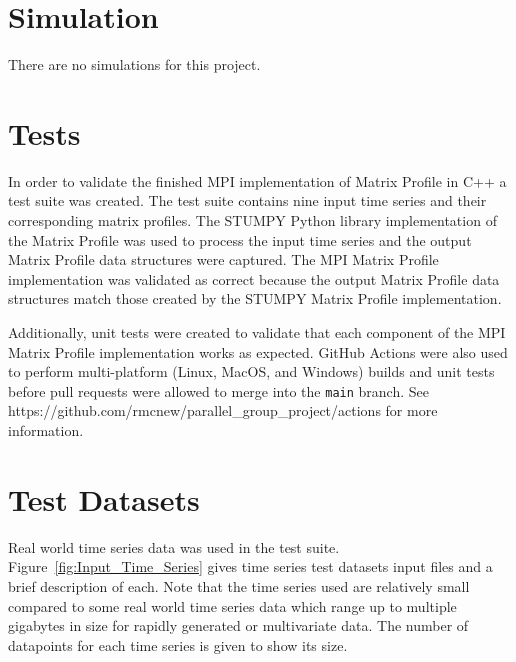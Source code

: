 \documentclass[conference]{IEEEtran}
\begin{document}
\section{Simulation}
There are no simulations for this project.

\section{Tests}
In order to validate the finished MPI implementation of Matrix Profile in C++ a test suite was created.  The test suite contains nine input time series and their corresponding matrix profiles.  The STUMPY\cite{Stumpy} Python library implementation of the Matrix Profile was used to process the input time series and the output Matrix Profile data structures were captured.  The MPI Matrix Profile implementation was validated as correct because the output Matrix Profile data structures match those created by the STUMPY Matrix Profile implementation. 

Additionally, unit tests were created to validate that each component of the MPI Matrix Profile implementation works as expected.  GitHub Actions were also used to perform multi-platform (Linux, MacOS, and Windows) builds and unit tests before pull requests were allowed to merge into the \texttt{main} branch.  See https://github.com/rmcnew/parallel\_group\_project/actions for more information.

\section{Test Datasets}
Real world time series data was used in the test suite.  Figure~\ref{fig:Input_Time_Series} gives time series test datasets input files and a brief description of each.  Note that the time series used are relatively small compared to some real world time series data which range up to multiple gigabytes in size for rapidly generated or multivariate data.  The number of datapoints for each time series is given to show its size.
\end{document}
